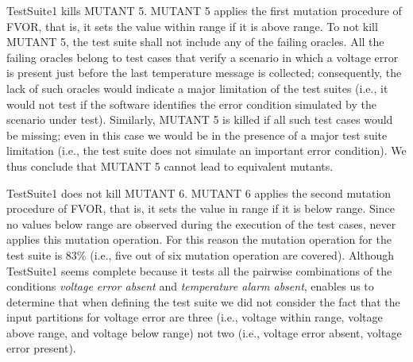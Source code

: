 TestSuite1 kills MUTANT 5. MUTANT 5 applies the first mutation procedure of FVOR, that is, it sets the value within range if it is above range. 
To not kill MUTANT 5, the test suite shall not include any of the failing oracles. All the failing oracles belong to test cases that verify a scenario in which a voltage error is present just before the last temperature message is collected; consequently, the lack of such oracles would indicate a major limitation of the test suites (i.e., it would not test if the software identifies the error condition simulated by the scenario under test). Similarly, MUTANT 5 is killed if all such test cases would be missing; even in this case we would be in the presence of a major test suite limitation (i.e., the test suite does not simulate an important error condition). We thus conclude that MUTANT 5 cannot lead to equivalent mutants. 

TestSuite1 does not kill MUTANT 6. MUTANT 6 applies the second mutation procedure of FVOR, that is, it sets the value in range if it is below range. Since no values below range are observed during the execution of the test cases, \APPR never applies this mutation operation. For this reason the mutation operation for the test suite is 83\% (i.e., five out of six mutation operation are covered). Although TestSuite1 seems complete because it tests all the pairwise combinations of the conditions \emph{voltage error absent} and \emph{temperature alarm absent}, \APPR enables us to determine that when defining the test suite we did not consider the fact that the input partitions for voltage error are three (i.e., voltage within range, voltage above range, and voltage below range) not two (i.e., voltage error absent, voltage error present).




